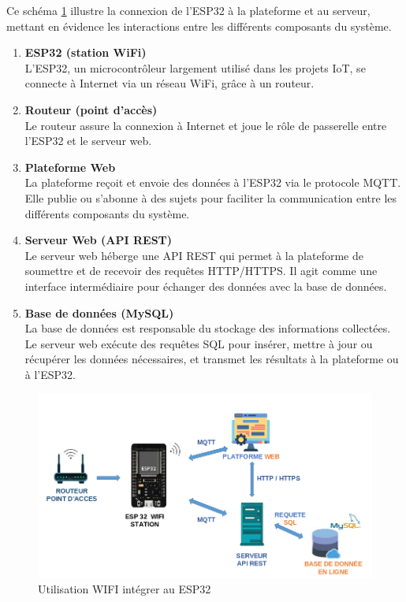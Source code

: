 Ce schéma \ref{fig:moduleGSM1} illustre la connexion de l'ESP32 à la plateforme et au serveur, mettant en évidence les interactions entre les différents composants du système.

\begin{enumerate}
	\item \textbf{ESP32 (station WiFi)} \\
	L'ESP32, un microcontrôleur largement utilisé dans les projets IoT, se connecte à Internet via un réseau WiFi, grâce à un routeur.
	
	\item \textbf{Routeur (point d'accès)} \\
	Le routeur assure la connexion à Internet et joue le rôle de passerelle entre l'ESP32 et le serveur web.
	
	\item \textbf{Plateforme Web} \\
	La plateforme reçoit et envoie des données à l'ESP32 via le protocole MQTT. Elle publie ou s'abonne à des sujets pour faciliter la communication entre les différents composants du système.
	
	\item \textbf{Serveur Web (API REST)} \\
	Le serveur web héberge une API REST qui permet à la plateforme de soumettre et de recevoir des requêtes HTTP/HTTPS. Il agit comme une interface intermédiaire pour échanger des données avec la base de données.
	
	\item \textbf{Base de données (MySQL)} \\
	La base de données est responsable du stockage des informations collectées. Le serveur web exécute des requêtes SQL pour insérer, mettre à jour ou récupérer les données nécessaires, et transmet les résultats à la plateforme ou à l'ESP32.
\end{enumerate}


\begin{figure}[H]
	\centering
	\includegraphics[width=17cm]{./img/composants/espWIFI.png}
	\caption{Utilisation WIFI intégrer au ESP32}
	\label{fig:moduleGSM1}
\end{figure}

